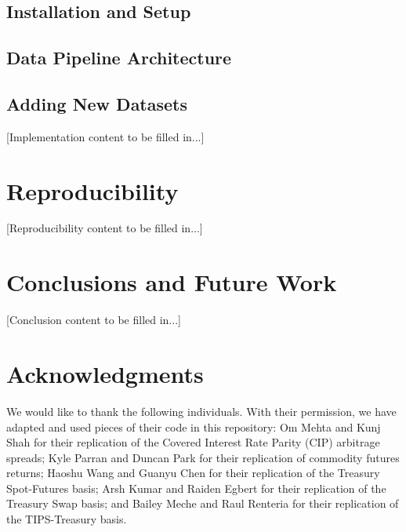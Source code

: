 \documentclass{article}
\begin{document}
\subsection{Installation and Setup}

\subsection{Data Pipeline Architecture}

\subsection{Adding New Datasets}

[Implementation content to be filled in...]

\section{Reproducibility}
\label{sec:reproducibility}


[Reproducibility content to be filled in...]

\section{Conclusions and Future Work}
\label{sec:conclusion}


[Conclusion content to be filled in...]

\section*{Acknowledgments}

We would like to thank the following individuals. With their permission, we have adapted and used pieces of their code in this repository: Om Mehta and Kunj Shah for their replication of the Covered Interest Rate Parity (CIP) arbitrage spreads; Kyle Parran and Duncan Park for their replication of commodity futures returns; Haoshu Wang and Guanyu Chen for their replication of the Treasury Spot-Futures basis; Arsh Kumar and Raiden Egbert for their replication of the Treasury Swap basis; and Bailey Meche and Raul Renteria for their replication of the TIPS-Treasury basis.
\end{document}
